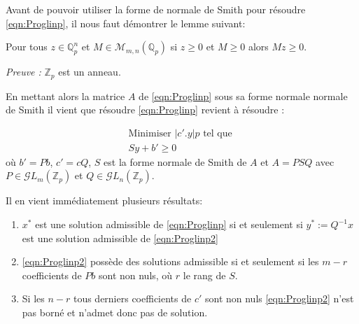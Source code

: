 Avant de pouvoir utiliser la forme de normale de Smith pour résoudre \ref{eqn:Proglinp}, il nous faut démontrer le lemme suivant:

\begin{lemme}
	Pour tous $z \in \mathbb{Q}_{ p } ^n$ et $M \in \mathcal{M}_{m,n}\left( \mathbb{Q}_{ p }  \right)  $ si $z\ge 0$ et $M\ge 0$ alors $Mz\ge 0$.  
\end{lemme}
\textit{Preuve :} $\mathbb{Z}_p$ est un anneau. \hfill\qedsymbol



En mettant alors la matrice $A$ de \ref{eqn:Proglinp} sous sa forme normale normale de Smith il vient que résoudre \ref{eqn:Proglinp} revient à résoudre :    


\begin{equation}
	  \tag{PLp'}
\begin{matrix}
	\text{Minimiser } |c'.y|p \text{ tel que }\\
	Sy + b' \ge 0
 \end{matrix}
	    \label{eqn:Proglinp2}
\end{equation}
où $b' = Pb$, $c' = cQ$, $S$ est la forme normale de Smith de $A$ et $A = P S Q$ avec $P \in \mathcal{G}L_m\left( \mathbb{Z}_p \right)$ et $ Q \in \mathcal{G}L_n\left( \mathbb{Z}_p \right)$.

\begin{remarques}
	
Il en vient immédiatement plusieurs résultats:
\begin{enumerate}
	\item $x^*$ est une solution admissible de \ref{eqn:Proglinp} si et seulement si $y^* := Q^{-1} x$ est une solution admissible de \ref{eqn:Proglinp2}
	\item \ref{eqn:Proglinp2} possède des solutions admissible si et seulement si les $m-r$ coefficients de $Pb$ sont non nuls, où $r$ le rang de $S$.     
	\item Si les $n-r$ tous derniers coefficients de $c'$ sont non nuls \ref{eqn:Proglinp2} n'est pas borné et n'admet donc pas de solution.   
\end{enumerate}

\end{remarques}


